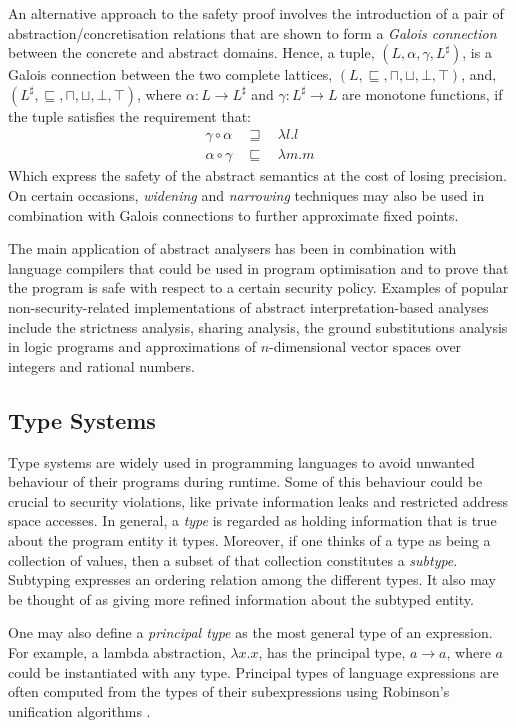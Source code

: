 \documentclass[10pt,a4paper,final,oneside,fleqn]{book}
\begin{document}
An alternative approach to the safety proof involves the introduction of a pair of abstraction/concretisation relations that are shown to form a {\itshape Galois connection\/} between the concrete and abstract domains.  Hence, a tuple, $(L,\alpha,\gamma,L^\sharp)$, is a Galois connection between the two complete lattices, $(L,\sqsubseteq,\sqcap,\sqcup,\bot,\top)$, and, $(L^\sharp,\sqsubseteq,\sqcap,\sqcup,\bot,\top)$, where $\alpha:L\to L^\sharp$ and $\gamma:L^\sharp\to L$ are monotone functions, if the tuple satisfies the requirement that:
\begin{eqnarray*}
\gamma\circ\alpha~~&\sqsupseteq&~~\lambda l.l\\
\alpha\circ\gamma~~&\sqsubseteq&~~\lambda m.m
\end{eqnarray*}
Which express the safety of the abstract semantics at the cost of losing precision.  On certain occasions, {\itshape widening\/} and {\itshape narrowing\/} techniques may also be used in combination with Galois connections to further approximate fixed points.

The main application of abstract analysers has been in combination with language compilers that could be used in program optimisation and to prove that the program is safe with respect to a certain security policy. Examples of popular non-security-related implementations of abstract interpretation-based analyses include the strictness analysis, sharing analysis, the ground substitutions analysis in logic programs and approximations of $n$-dimensional vector spaces over integers and rational numbers.
\subsection{Type Systems\label{introtype}}
Type systems are widely used in programming languages to avoid unwanted behaviour of their programs during runtime.  Some of this behaviour could be crucial to security violations, like private information leaks and restricted address space accesses.  In general, a {\itshape type\/} is regarded as holding information that is true about the program entity it types.  Moreover, if one thinks of a type as being a collection of values, then a subset of that collection constitutes a {\itshape subtype\/}.  Subtyping expresses an ordering relation among the different types.  It also may be thought of as giving more refined information about the subtyped entity.

One may also define a {\itshape principal type\/} as the most general type of an expression.  For example, a lambda abstraction, $\lambda x.x$, has the principal type, $a\to a$, where $a$ could be instantiated with any type. Principal types of language expressions are often computed from the types of their subexpressions using Robinson's unification algorithms \cite{robin1}.
\end{document}
